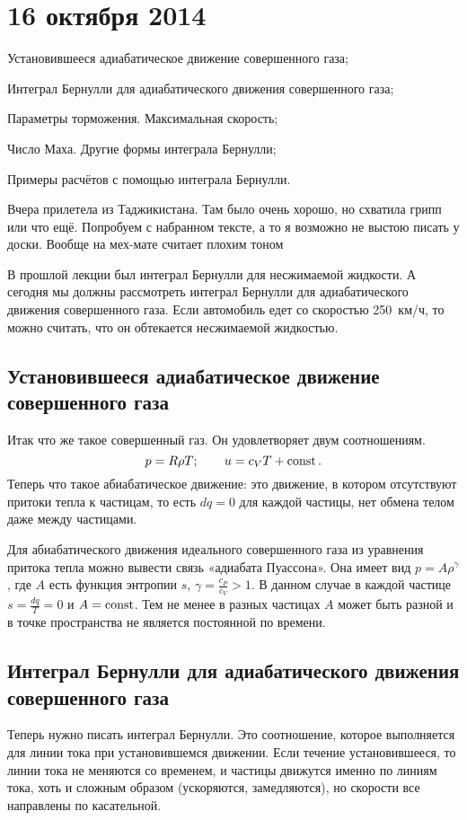 \section{16 октября 2014}
\begin{roItems}
\item Установившееся адиабатическое движение совершенного газа;
\item Интеграл Бернулли для адиабатического движения совершенного газа;
\item Параметры торможения. Максимальная скорость;
\item Число Маха. Другие формы интеграла Бернулли;
\item Примеры расчётов с помощью интеграла Бернулли.
\end{roItems}

Вчера прилетела из Таджикистана. Там было очень хорошо, но схватила грипп или что ещё. Попробуем с набранном тексте, а то я возможно не выстою писать у доски. Вообще на мех-мате считает плохим тоном 

В прошлой лекции был интеграл Бернулли для несжимаемой жидкости. А сегодня мы должны рассмотреть интеграл Бернулли для адиабатического движения совершенного газа. Если автомобиль едет со скоростью 250~км/ч, то можно считать, что он обтекается несжимаемой жидкостью.

\subsection{Установившееся адиабатическое движение совершенного газа}
Итак что же такое совершенный газ. Он удовлетворяет двум соотношениям.
\begin{equation}
  p = R\rho T;\qquad u = c_VT+\operatorname{const}.
\end{equation}
Теперь что такое абиабатическое движение: это движение, в котором отсутствуют притоки тепла к частицам, то есть $dq=0$ для каждой частицы, нет обмена телом даже между частицами.

Для абиабатического движения идеального совершенного газа из уравнения притока тепла можно вывести связь «адиабата Пуассона». Она имеет вид $p=A\rho^\gamma$, где $A$ есть функция энтропии $s$, $\gamma=\frac{c_P}{c_V}>1$. В данном случае в каждой частице $s=\frac{dq}T=0$ и $A=\operatorname{const}$. Тем не менее в разных частицах $A$ может быть разной и в точке пространства не является постоянной по времени.

\subsection{Интеграл Бернулли для адиабатического движения совершенного газа}
Теперь нужно писать интеграл Бернулли. Это соотношение, которое выполняется для линии тока при установившемся движении.
Если течение установившееся, то линии тока не меняются со временем, и частицы движутся именно по линиям тока, хоть и сложным образом (ускоряются, замедляются), но скорости все направлены по касательной.

